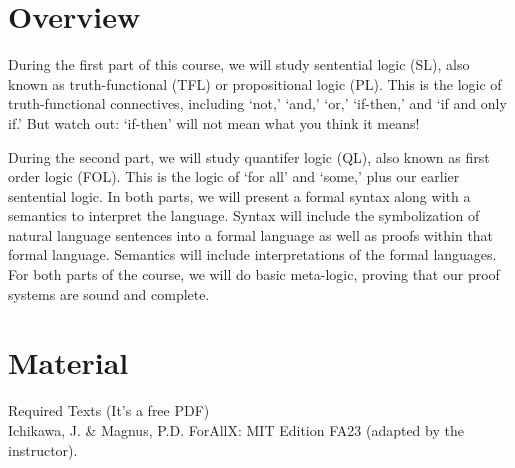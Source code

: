 \documentclass[letterpaper]{inzane_syllabus} %
\begin{document}

\makeprofile %

\section{Overview}

During the first part of this course, we will study sentential logic (SL), also known as truth-functional (TFL) or propositional logic (PL). 
This is the logic of truth-functional connectives, including ‘not,’ ‘and,’ ‘or,’ ‘if-then,’ and ‘if and only if.’ 
But watch out: ‘if-then’ will not mean what you think it means! 

During the second part, we will study quantifer logic (QL), also known as first order logic (FOL). 
This is the logic of ‘for all’ and ‘some,’ plus our earlier sentential logic. 
In both parts, we will present a formal syntax along with a semantics to interpret the language.
Syntax will include the symbolization of natural language sentences into a formal language as well as proofs within that formal language. 
Semantics will include interpretations of the formal languages. 
For both parts of the course, we will do basic meta-logic, proving that our proof systems are sound and complete.

\vspace{0.5cm} %
\section{Material}

{\color{myCOLOR} Required Texts (It’s a free PDF)}\\
Ichikawa, J. \& Magnus, P.D. ForAllX: MIT Edition FA23 (adapted by the instructor). \\
\end{document}
